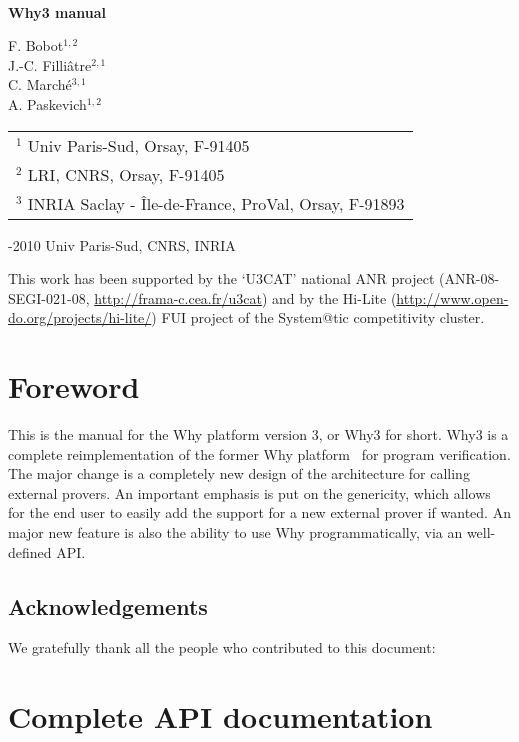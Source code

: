 \documentclass[a4paper]{memoir}
\begin{document}
\thispagestyle{empty}

\begin{center}

~

\vfill

{\Huge\bfseries Why3 manual}

\vfill

{\Large F. Bobot$^{1,2}$ \\ 
J.-C. Filli\^atre$^{2,1}$  \\ 
C. March\'e$^{3,1}$ \\ 
A. Paskevich$^{1,2}$}

\vfill

\begin{tabular}{l}
$^1$ Univ Paris-Sud, Orsay, F-91405 \\
$^2$ LRI, CNRS, Orsay, F-91405 \\
$^3$ INRIA Saclay - \^Ile-de-France, ProVal, Orsay, F-91893 
\end{tabular}

\vfill

\begin{flushleft}
  -2010 Univ Paris-Sud, CNRS, INRIA

  This work has been supported by the `U3CAT' national ANR project
  (ANR-08-SEGI-021-08, \url{http://frama-c.cea.fr/u3cat}) and by the
  Hi-Lite (\url{http://www.open-do.org/projects/hi-lite/}) FUI project of the
  System@tic competitivity cluster.

\end{flushleft}
\end{center}

\cleardoublepage

\tableofcontents

\chapter*{Foreword}

This is the manual for the Why platform version 3, or Why3 for
short. Why3 is a complete reimplementation of the former Why
platform~\cite{filliatre07cav} for program verification.  The major
change is a completely new design of the architecture for calling
external provers. An important emphasis is put on the genericity,
which allows for the end user to easily add the support for a new
external prover if wanted.  An major new feature is also the ability
to use Why programmatically, via an well-defined API.

\section*{Acknowledgements}

We gratefully thank all the people who contributed to this document:











\chapter{Complete API documentation}
\label{chap:apidoc}





\end{document}
